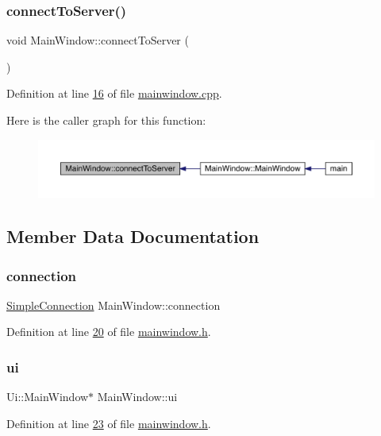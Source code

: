 \subsubsection{\texorpdfstring{connect\+To\+Server()}{connectToServer()}}
{\footnotesize\ttfamily void Main\+Window\+::connect\+To\+Server (\begin{DoxyParamCaption}{ }\end{DoxyParamCaption})\hspace{0.3cm}{\ttfamily [protected]}}



Definition at line \hyperlink{a00080_source_l00016}{16} of file \hyperlink{a00080_source}{mainwindow.\+cpp}.

Here is the caller graph for this function\+:
\nopagebreak
\begin{figure}[H]
\begin{center}
\leavevmode
\includegraphics[width=350pt]{dd/d4c/a00177_abfedef9edae209df536e8c1c7cf0e7ae_icgraph}
\end{center}
\end{figure}


\subsection{Member Data Documentation}
\mbox{\label{a00177_a8235680bc39bc64e5686dfcaccabf72f}} 
\subsubsection{\texorpdfstring{connection}{connection}}
{\footnotesize\ttfamily \hyperlink{a00125}{Simple\+Connection} Main\+Window\+::connection\hspace{0.3cm}{\ttfamily [protected]}}



Definition at line \hyperlink{a00083_source_l00020}{20} of file \hyperlink{a00083_source}{mainwindow.\+h}.

\mbox{\label{a00177_a35466a70ed47252a0191168126a352a5}} 
\subsubsection{\texorpdfstring{ui}{ui}}
{\footnotesize\ttfamily Ui\+::\+Main\+Window$\ast$ Main\+Window\+::ui\hspace{0.3cm}{\ttfamily [private]}}



Definition at line \hyperlink{a00083_source_l00023}{23} of file \hyperlink{a00083_source}{mainwindow.\+h}.

